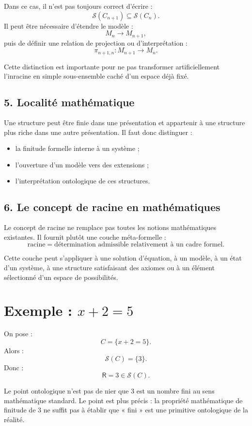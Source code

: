 \documentclass[11pt,a4paper]{article}
\newcommand{\Rac}{\mathsf{R}}
\newcommand{\Sol}{\mathcal{S}}
\begin{document}
Dans ce cas, il n'est pas toujours correct d'écrire :
\[
\Sol(C_{n+1})\subseteq\Sol(C_n).
\]
Il peut être nécessaire d'étendre le modèle :
\[
M_n\longrightarrow M_{n+1},
\]
puis de définir une relation de projection ou d'interprétation :
\[
\pi_{n+1,n}:M_{n+1}\to M_n.
\]

Cette distinction est importante pour ne pas transformer artificiellement
l'inracine en simple sous-ensemble caché d'un espace déjà fixé.

\subsection{5. Localité mathématique}

Une structure peut être finie dans une présentation et appartenir à une
structure plus riche dans une autre présentation. Il faut donc distinguer :
\begin{itemize}
    \item la finitude formelle interne à un système ;
    \item l'ouverture d'un modèle vers des extensions ;
    \item l'interprétation ontologique de ces structures.
\end{itemize}

\subsection{6. Le concept de racine en mathématiques}

Le concept de racine ne remplace pas toutes les notions mathématiques
existantes. Il fournit plutôt une couche méta-formelle :
\[
\boxed{
\text{racine} = \text{détermination admissible relativement à un cadre formel}.
}
\]

Cette couche peut s'appliquer à une solution d'équation, à un modèle, à un
état d'un système, à une structure satisfaisant des axiomes ou à un élément
sélectionné d'un espace de possibilités.

\section{Exemple : \(x+2=5\)}

On pose :
\[
C=\{x+2=5\}.
\]
Alors :
\[
\Sol(C)=\{3\}.
\]
Donc :
\[
\boxed{\Rac=3\in\Sol(C).}
\]

Le point ontologique n'est pas de nier que \(3\) est un nombre fini au sens
mathématique standard. Le point est plus précis : la propriété mathématique
de finitude de \(3\) ne suffit pas à établir que « fini » est une primitive
ontologique de la réalité.
\end{document}
